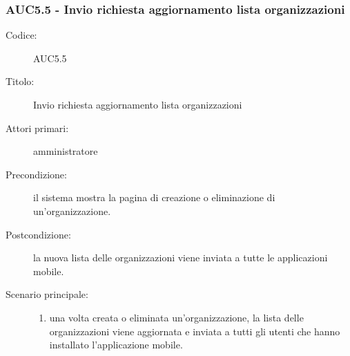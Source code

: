 \documentclass[../../../analisi-dei-requisiti.tex]{subfiles}
\begin{document}
\subsubsection{AUC5.5 - Invio richiesta aggiornamento lista organizzazioni}%
\label{subsub:AUC5.5}
\begin{description}
  \item[Codice:] AUC5.5
  \item[Titolo:] Invio richiesta aggiornamento lista organizzazioni
  \item[Attori primari:] amministratore
  \item[Precondizione:] il sistema mostra la pagina di creazione o eliminazione di un'organizzazione.
  \item[Postcondizione:] la nuova lista delle organizzazioni viene inviata a tutte le applicazioni mobile.
  \item[Scenario principale:]
  \begin{enumerate}
    \item una volta creata o eliminata un'organizzazione, la lista delle organizzazioni viene aggiornata e inviata a tutti gli utenti che hanno installato l'applicazione mobile.
  \end{enumerate}
\end{description}
\end{document}
